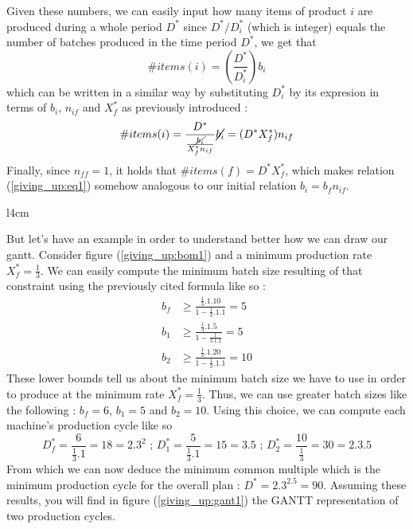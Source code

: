 Given these numbers, we can easily input how many items of product $i$ are produced during a whole period $D^*$ since $D^*/D_i^*$ (which is integer) equals the number of batches produced in the time period $D^*$, we get that \[ \#items(i) = \left( \frac{D^*}{D_i^*} \right)b_i \] which can be written in a similar way by substituting $D_i^*$ by its expresion in terms of $b_i$, $n_{if}$ and $X_f^*$ as previously introduced : \begin{equation} \#items(i) = \dfrac{D^*}{ \frac{\cancel{b_i}}{X_f^*n_{if}} }\cancel{b_i} = (D^*X_f^*)n_{if} \label{giving_up:eq1} \end{equation} Finally, since $n_{ff} = 1$, it holds that $\#items(f) = D^*X_f^*$, which makes relation (\ref{giving_up:eq1}) somehow analogous to our initial relation $b_i = b_fn_{if}$.

\begin{wrapfigure}[14]{l}{4cm}
    \centering
    \caption{\label{giving_up:bom1}Example}
\end{wrapfigure}

But let's have an example in order to understand better how we can draw our gantt. Consider figure (\ref{giving_up:bom1}) and a minimum production rate $X_f^* = \frac{1}{3}$. We can easily compute the minimum batch size resulting of that constraint using the previously cited formula like so :
\[
    \begin{split}
        b_f &\ge \frac{\frac{1}{3}.1.10}{1-\frac{1}{3}.1.1} = 5\\
        b_1 &\ge \frac{\frac{1}{3}.1.5}{1 -\frac{1}{3.1.2}} = 5\\
        b_2 &\ge \frac{\frac{1}{3}.1.20}{1-\frac{1}{3}.1.1} = 10
    \end{split}
\]
These lower bounds tell us about the minimum batch size we have to use in order to produce at the minimum rate $X_f^*=\frac{1}{3}$. Thus, we can use greater batch sizes like the following : $b_f = 6$, $b_1 = 5$ and $b_2 = 10$. Using this choice, we can compute each machine's production cycle like so 
\[
    D_f^* = \frac{6}{\frac{1}{3}.1} = 18 = 2.3^2 \textrm{ ; }
    D_1^* = \frac{5}{\frac{1}{3}.1} = 15 = 3.5 \textrm{ ; }
    D_2^* = \frac{10}{\frac{1}{3}} = 30 = 2.3.5
\]
From which we can now deduce the minimum common multiple which is the minimum production cycle for the overall plan : $D^* = 2.3^2.5 = 90$. Assuming these results, you will find in figure (\ref{giving_up:gant1}) the GANTT representation of two production cycles.

